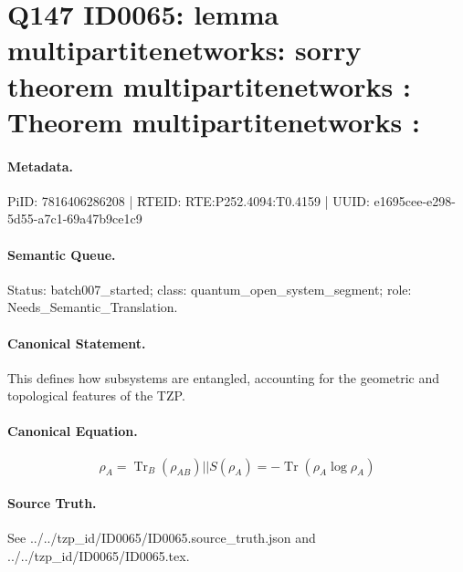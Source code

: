 \section*{Q147 ID0065: lemma multipartitenetworks: sorry theorem multipartitenetworks : Theorem multipartitenetworks :}
\paragraph{Metadata.}
PiID: 7816406286208 | RTEID: RTE:P252.4094:T0.4159 | UUID: e1695cee-e298-5d55-a7c1-69a47b9ce1c9

\paragraph{Semantic Queue.}
Status: batch007\_started; class: quantum\_open\_system\_segment; role: Needs\_Semantic\_Translation.

\paragraph{Canonical Statement.}
This defines how subsystems are entangled, accounting for the geometric and topological features of the TZP.

\paragraph{Canonical Equation.}
\[
\rho_{A} = \operatorname{Tr}_{B}(\rho_{AB}) || S(\rho_{A}) = -\operatorname{Tr}\!\left(\rho_{A}\log\rho_{A}\right)
\]

\paragraph{Source Truth.}
See ../../tzp\_id/ID0065/ID0065.source\_truth.json and ../../tzp\_id/ID0065/ID0065.tex.
